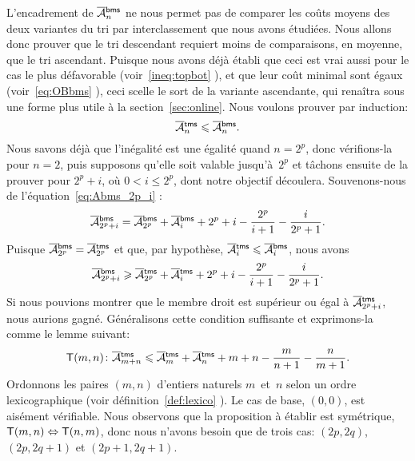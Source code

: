 L'encadrement de \(\OM{\fun{bms}}{n}\) ne nous permet pas de comparer
les coûts moyens des deux variantes du tri par interclassement que
nous avons étudiées. Nous allons donc prouver que le tri descendant
requiert moins de comparaisons, en moyenne, que le tri
ascendant. Puisque nous avons déjà établi que ceci est vrai aussi pour
le cas le plus défavorable (voir~\eqref{ineq:topbot}
), et que leur coût minimal sont égaux
(voir~\eqref{eq:OBbms} ), ceci scelle le sort de la
variante ascendante, qui renaîtra sous une forme plus utile à la
section~\vref{sec:online}. Nous voulons prouver par induction:
\begin{equation*}
\OM{\fun{tms}}{n} \leqslant \OM{\fun{bms}}{n}.
\end{equation*}
Nous savons déjà que l'inégalité est une égalité quand \(n=2^p\), donc
vérifions-la pour \(n=2\), puis supposons qu'elle soit valable
jusqu'à~\(2^p\) et tâchons ensuite de la prouver pour \(2^p+i\), où
\(0 < i \leqslant 2^p\), dont notre objectif découlera. Souvenons-nous
de l'équation~\eqref{eq:Abms_2p_i} :
\begin{equation*}
\OM{\fun{bms}}{2^p+i} = \OM{\fun{bms}}{2^p} + \OM{\fun{bms}}{i}
+ 2^p + i - \frac{2^p}{i+1} - \frac{i}{2^p+1}.
\end{equation*}
Puisque \(\OM{\fun{bms}}{2^p} = \OM{\fun{tms}}{2^p}\) et que, par
hypothèse, \(\OM{\fun{tms}}{i} \leqslant \OM{\fun{bms}}{i}\), nous
avons
\begin{equation}
\OM{\fun{bms}}{2^p+i} \geqslant \OM{\fun{tms}}{2^p} + \OM{\fun{tms}}{i}
+ 2^p + i - \frac{2^p}{i+1} - \frac{i}{2^p+1}.
\label{ineq:Atms_Abms}
\end{equation}
Si nous pouvions montrer que le membre droit est supérieur ou égal à
\(\OM{\fun{tms}}{2^p+i}\), nous aurions gagné. Généralisons cette
condition suffisante et exprimons-la comme le lemme suivant:
\begin{equation*}
  \pred{T}{m,n} \colon
  \OM{\fun{tms}}{m+n} \leqslant \OM{\fun{tms}}{m} + \OM{\fun{tms}}{n} +
  m + n - \frac{m}{n+1} - \frac{n}{m+1}.
\end{equation*}
Ordonnons les paires \((m,n)\) d'entiers naturels \(m\)~et~\(n\) selon
un ordre lexicographique (voir définition~\eqref{def:lexico}
). Le cas de base, \((0,0)\), est aisément
vérifiable. Nous observons que la proposition à établir est
symétrique, \(\textsf{T}({m,n}) \Leftrightarrow \textsf{T}({n,m})\), donc nous
n'avons besoin que de trois cas: \((2p,2q)\), \((2p,2q+1)\) et
\((2p+1,2q+1)\).
